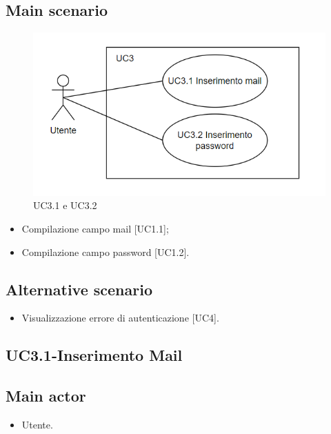 \documentclass{article}
\begin{document}
    \subsection*{Main scenario}
        \begin{figure}[h]
            \centering
            \includegraphics{./imgUML/UC3-SOTTOCASI.png}
            \caption{UC3.1 e UC3.2}
            \label{fig:UC3 SOTTOCASI}
        \end{figure}
        \begin{itemize}
            \item Compilazione campo mail [UC1.1];
            \item Compilazione campo password [UC1.2].
        \end{itemize}
            
        \subsection*{Alternative scenario}
            \begin{itemize}
                \item Visualizzazione errore di autenticazione [UC4].
            \end{itemize}
            
\subsection{UC3.1-Inserimento Mail}
    
     \subsection*{Main actor}
         \begin{itemize}
             \item Utente.
         \end{itemize}
\end{document}

